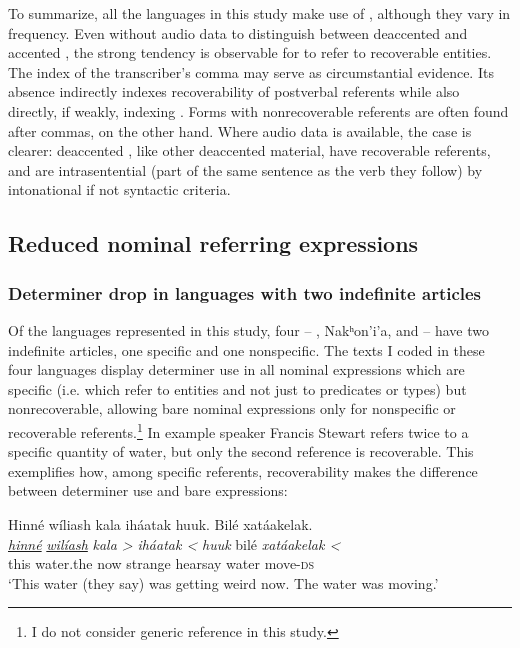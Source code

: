 \documentclass[output=paper]{LSP/langsci}
\begin{document}
To summarize, all the languages in this study make use of , although they vary in frequency. Even without audio data to distinguish between deaccented and accented , the strong tendency is observable for  to refer to recoverable entities. The index of the transcriber’s comma may serve as circumstantial evidence. Its absence indirectly indexes recoverability of postverbal referents while also directly, if weakly, indexing . Forms with nonrecoverable referents are often found after commas, on the other hand. Where audio data is available, the case is clearer: deaccented , like other deaccented material, have recoverable referents, and are intrasentential (part of the same sentence as the verb they follow) by intonational if not syntactic criteria.

\subsection{Reduced nominal referring expressions}\label{nominalreduction}

\subsubsection{Determiner drop in languages with two indefinite articles}\label{droptwoindef}

Of the languages represented in this study, four -- , Nakʰon’i’a,  and  -- have two indefinite articles, one specific and one nonspecific. The texts I coded in these four languages display determiner use in all nominal expressions which are specific (i.e. which refer to entities and not just to predicates or types) but nonrecoverable, allowing bare nominal expressions only for nonspecific or recoverable referents.\footnote{I do not consider generic reference in this study.} In example   speaker Francis Stewart refers twice to a specific quantity of water, but only the second reference is recoverable. This exemplifies how, among specific referents, recoverability makes the difference between determiner use and bare expressions:

\ea\label{stewartdrop}
Hinné wíliash kala iháatak huuk. Bilé xatáakelak.\footnotemark\\
\gll	\emph{\underline{hinné}} 	\emph{\underline{wilíash}} 		\emph{kala >} 	\emph{iháatak <}		\emph{huuk} 	bilé 		\emph{xatáakelak <}\\
	this 				water.the 					now 			strange 			hearsay 		water		move-\textsc{ds}\\
\glt	`This water (they say) was getting weird now. The water was moving.'
\z
\end{document}
